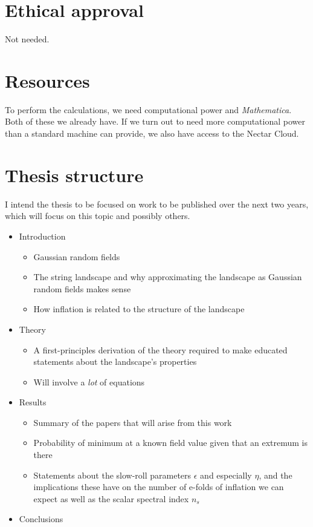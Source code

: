 \documentclass[12pt]{article}
\begin{document}
\section{Ethical approval}
Not needed.

\section{Resources}
To perform the calculations, we need computational power and \emph{Mathematica}. Both of these we already have. If we turn out to need more computational power than a standard machine can provide, we also have access to the Nectar Cloud.

\section{Thesis structure}
I intend the thesis to be focused on work to be published over the next two years, which will focus on this topic and possibly others.

\begin{itemize}
\item Introduction
\begin{itemize}
\item Gaussian random fields
\item The string landscape and why approximating the landscape as Gaussian random fields makes sense
\item How inflation is related to the structure of the landscape
\end{itemize}
\item Theory
\begin{itemize}
\item A first-principles derivation of the theory required to make educated statements about the landscape's properties
\item Will involve a \emph{lot} of equations
\end{itemize}
\item Results
\begin{itemize}
\item Summary of the papers that will arise from this work
\item Probability of minimum at a known field value given that an extremum is there
\item Statements about the slow-roll parameters $\epsilon$ and especially $\eta$, and the implications these have on the number of e-folds of inflation we can expect as well as the scalar spectral index $n_s$
\end{itemize}
\item Conclusions
\end{itemize}
\end{document}
